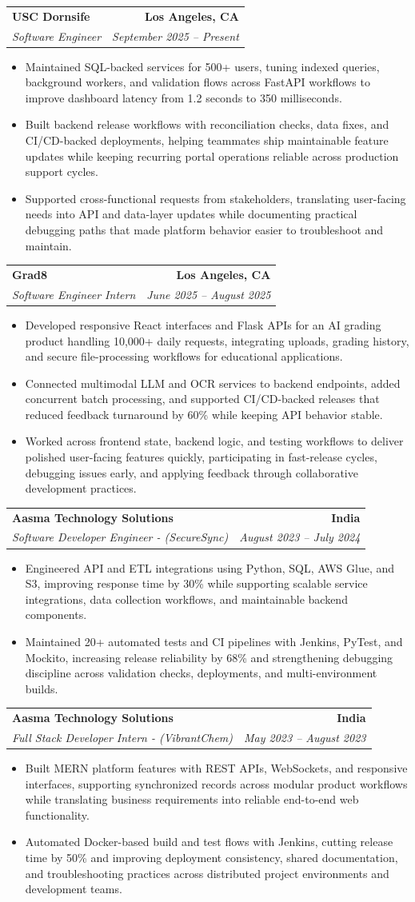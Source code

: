 \documentclass[letterpaper,10pt]{article}
\makeatletter
\newcommand{\resumeItem}[1]{\item\small{{#1 \vspace{-2pt}}}}
\newcommand{\resumeSubheading}[4]{\vspace{-1pt}\item\begin{tabular*}{1.0\textwidth}[t]{l@{\extracolsep{\fill}}r}\textbf{#1} & \textbf{\small #2} \\\textit{\small#3} & \textit{\small #4} \\\end{tabular*}\vspace{-2pt}}
\newcommand{\resumeItemListStart}{\begin{itemize}[leftmargin=0.15in,label=\textbullet,itemsep=2pt,topsep=0pt,parsep=0pt,partopsep=0pt]}
\newcommand{\resumeItemListEnd}{\end{itemize}\vspace{-4pt}}
\makeatother
\begin{document}
\resumeSubheading{USC Dornsife}{Los Angeles, CA}{Software Engineer}{September 2025 -- Present}
\resumeItemListStart
\resumeItem{Maintained SQL-backed services for 500+ users, tuning indexed queries, background workers, and validation flows across FastAPI workflows to improve dashboard latency from 1.2 seconds to 350 milliseconds.}
\resumeItem{Built backend release workflows with reconciliation checks, data fixes, and CI/CD-backed deployments, helping teammates ship maintainable feature updates while keeping recurring portal operations reliable across production support cycles.}
\resumeItem{Supported cross-functional requests from stakeholders, translating user-facing needs into API and data-layer updates while documenting practical debugging paths that made platform behavior easier to troubleshoot and maintain.}
\resumeItemListEnd

\resumeSubheading{Grad8}{Los Angeles, CA}{Software Engineer Intern}{June 2025 -- August 2025}
\resumeItemListStart
\resumeItem{Developed responsive React interfaces and Flask APIs for an AI grading product handling 10,000+ daily requests, integrating uploads, grading history, and secure file-processing workflows for educational applications.}
\resumeItem{Connected multimodal LLM and OCR services to backend endpoints, added concurrent batch processing, and supported CI/CD-backed releases that reduced feedback turnaround by 60\% while keeping API behavior stable.}
\resumeItem{Worked across frontend state, backend logic, and testing workflows to deliver polished user-facing features quickly, participating in fast-release cycles, debugging issues early, and applying feedback through collaborative development practices.}
\resumeItemListEnd

\resumeSubheading{Aasma Technology Solutions}{India}{Software Developer Engineer - (SecureSync)}{August 2023 -- July 2024}
\resumeItemListStart
\resumeItem{Engineered API and ETL integrations using Python, SQL, AWS Glue, and S3, improving response time by 30\% while supporting scalable service integrations, data collection workflows, and maintainable backend components.}
\resumeItem{Maintained 20+ automated tests and CI pipelines with Jenkins, PyTest, and Mockito, increasing release reliability by 68\% and strengthening debugging discipline across validation checks, deployments, and multi-environment builds.}
\resumeItemListEnd

\resumeSubheading{Aasma Technology Solutions}{India}{Full Stack Developer Intern - (VibrantChem)}{May 2023 -- August 2023}
\resumeItemListStart
\resumeItem{Built MERN platform features with REST APIs, WebSockets, and responsive interfaces, supporting synchronized records across modular product workflows while translating business requirements into reliable end-to-end web functionality.}
\resumeItem{Automated Docker-based build and test flows with Jenkins, cutting release time by 50\% and improving deployment consistency, shared documentation, and troubleshooting practices across distributed project environments and development teams.}
\resumeItemListEnd
\end{document}
